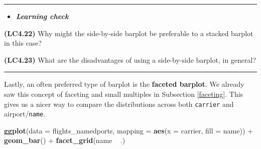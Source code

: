 \documentclass[]{tufte-book}
\newenvironment{Shaded}{\begin{snugshade}}{\end{snugshade}}
\newcommand{\KeywordTok}[1]{\textcolor[rgb]{0.13,0.29,0.53}{\textbf{{#1}}}}
\newcommand{\DataTypeTok}[1]{\textcolor[rgb]{0.13,0.29,0.53}{{#1}}}
\newcommand{\StringTok}[1]{\textcolor[rgb]{0.31,0.60,0.02}{{#1}}}
\newcommand{\NormalTok}[1]{{#1}}
\let\oldrule=\rule
\renewcommand{\rule}[1]{\oldrule{\linewidth}}
\newenvironment{rmdblock}[1]
  {\begin{shaded*}
  \begin{itemize}
  \renewcommand{\labelitemi}{
    \raisebox{-.7\height}[0pt][0pt]{
    }
  }
  \item
  }
  {
  \end{itemize}
  \end{shaded*}
  }
\newenvironment{learncheck}
  {\begin{rmdblock}{warning}}
  {\end{rmdblock}}
\begin{document}
\begin{center}\rule{0.5\linewidth}{\linethickness}\end{center}

\begin{learncheck}
\textbf{\emph{Learning check}}
\end{learncheck}

\textbf{(LC4.22)} Why might the side-by-side barplot be preferable to a
stacked barplot in this case?

\textbf{(LC4.23)} What are the disadvantages of using a side-by-side
barplot, in general?

\begin{center}\rule{0.5\linewidth}{\linethickness}\end{center}

Lastly, an often preferred type of barplot is the \textbf{faceted
barplot}. We already saw this concept of faceting and small multiples in
Subsection \ref{faceting}. This gives us a nicer way to compare the
distributions across both \texttt{carrier} and airport/\texttt{name}.

\begin{Shaded}
\begin{Highlighting}[]
\KeywordTok{ggplot}\NormalTok{(}\DataTypeTok{data =} \NormalTok{flights_namedports, }\DataTypeTok{mapping =} \KeywordTok{aes}\NormalTok{(}\DataTypeTok{x =} \NormalTok{carrier, }\DataTypeTok{fill =} \NormalTok{name)) +}
\StringTok{  }\KeywordTok{geom_bar}\NormalTok{() +}
\StringTok{  }\KeywordTok{facet_grid}\NormalTok{(name ~}\StringTok{ }\NormalTok{.)}
\end{Highlighting}
\end{Shaded}
\end{document}
